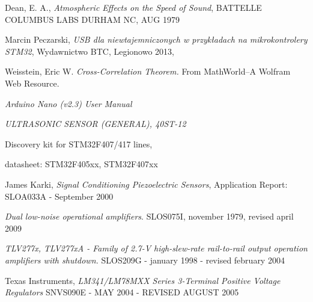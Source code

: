 \begin{thebibliography}{99}


    Dean, E. A., \textit{Atmospheric Effects on the Speed of Sound}, BATTELLE COLUMBUS LABS DURHAM NC, AUG 1979

   Marcin Peczarski, 
  \textit{USB dla niewtajemniczonych w przykładach na mikrokontrolery STM32}, Wydawnictwo BTC, Legionowo 2013,

   Weisstein, Eric W. \textit{Cross-Correlation Theorem.} From MathWorld--A Wolfram Web Resource. 

  \textit{Arduino Nano (v2.3) User Manual}
  
  \textit{ULTRASONIC SENSOR (GENERAL), 40ST-12}

   Discovery kit for STM32F407/417 lines,

   datasheet: STM32F405xx, STM32F407xx 
  
   James Karki, \textit{Signal Conditioning Piezoelectric Sensors}, 
  Application Report: SLOA033A - September 2000

   \textit{Dual low-noise operational amplifiers}. SLOS075I, november 1979, revised april 2009

   \textit{TLV277x, TLV277xA - Family of 2.7-V high-slew-rate rail-to-rail output operation amplifiers with shutdown.}
  SLOS209G - january 1998 - revised february 2004
  
   Texas Instruments, \textit{LM341/LM78MXX Series 3-Terminal Positive Voltage Regulators}
  SNVS090E - MAY 2004 - REVISED AUGUST 2005
  


\end{thebibliography}
